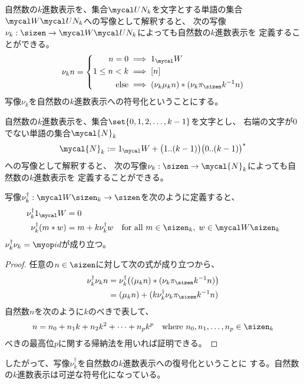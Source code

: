 	自然数の$k$進数表示を、集合$\Forget N_k$を文字とする単語の集合
	$\Word\Forget N_k$への写像として解釈すると、
	次の写像$\nu_k:\sizen\to\Word\Forget N_k$によっても自然数の$k$進数表示を
	定義することができる。
	\begin{equation*}\begin{split}
		\nu_k n = \left\{\begin{split}
			n = 0 &\implies 1_\Word \\
			1\le n < k &\implies [n] \\
			\text{else} &\implies (\nu_k\mu_kn) * (\nu_k\pi_\sizen k^{-1}n) \\
		\end{split}\right. \\ %
	\end{split}\end{equation*}
	写像$\nu_k$を自然数の$k$進数表示への符号化ということにする。


	\begin{todo}[ここまで]\label{todo:ここまで} %
	\end{todo} %

	自然数の$k$進数表示を、集合$\set{0,1,2,\dots,k-1}$を文字とし、
	右端の文字が$0$でない単語の集合$\mycal{N}_k$
	\begin{equation*}\begin{split}
		\mycal{N}_k := 1_\Word + \bigl(1..(k-1)\bigr)\bigl(0..(k-1)\bigr)^*
	\end{split}\end{equation*}
	への写像として解釈すると、
	次の写像$\nu_k:\sizen\to\mycal{N}_k$によっても自然数の$k$進数表示を
	定義することができる。

	写像$\nu_k^\dag:\Word\sizen_k\to\sizen$を次のように定義すると、
	\begin{equation*}\begin{split}
		\nu_k^\dag1_\Word &= 0 \\
		\nu_k^\dag(m*w) &= m + k\nu_k^\dag w
		\quad\text{for all }m\in\sizen_k,\;w\in \Word\sizen_k
	\end{split}\end{equation*}
	$\nu_k^\dag\nu_k=\id$が成り立つ。
	\begin{proof} 任意の$n\in\sizen$に対して次の式が成り立つから、
		\begin{equation*}\begin{split}
			\nu_k^\dag\nu_kn 
			&= \nu_k^\dag\bigl((\mu_kn) * (\nu_k\pi_\sizen k^{-1}n)\bigr) \\
			&= (\mu_kn) + (k\nu_k^\dag\nu_k\pi_\sizen k^{-1}n) \\
		\end{split}\end{equation*}
		自然数$n$を次のように$k$のべきで表して、
		\begin{equation*}\begin{split}
			n = n_0 + n_1k + n_2k^2 + \cdots + n_pk^p
			\quad\text{where } n_0,n_1,\dots,n_p\in\sizen_k
		\end{split}\end{equation*}
		べきの最高位$p$に関する帰納法を用いれば証明できる。
	\end{proof}
	したがって、写像$\nu_k^\dag$を自然数の$k$進数表示への復号化ということに
	する。自然数の$k$進数表示は可逆な符号化になっている。
	
